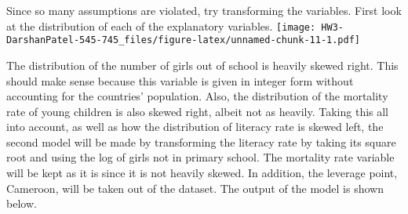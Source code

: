 \documentclass[]{article}
\begin{document}
Since so many assumptions are violated, try transforming the variables.
First look at the distribution of each of the explanatory variables.
\texttt{[image: HW3-DarshanPatel-545-745\_files/figure-latex/unnamed-chunk-11-1.pdf]}

The distribution of the number of girls out of school is heavily skewed
right. This should make sense because this variable is given in integer
form without accounting for the countries' population. Also, the
distribution of the mortality rate of young children is also skewed
right, albeit not as heavily. Taking this all into account, as well as
how the distribution of literacy rate is skewed left, the second model
will be made by transforming the literacy rate by taking its square root
and using the log of girls not in primary school. The mortality rate
variable will be kept as it is since it is not heavily skewed. In
addition, the leverage point, Cameroon, will be taken out of the
dataset. The output of the model is shown below.
\end{document}
